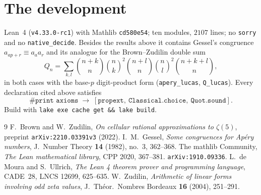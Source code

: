 \documentclass[11pt,a4paper]{amsart}
\theoremstyle{plain}
\theoremstyle{definition}
\theoremstyle{remark}
\begin{document}
\section{The development}

Lean~4 (\texttt{v4.33.0-rc1}) with Mathlib \texttt{cd580e54}; ten modules, $2107$ lines;
no \texttt{sorry} and no \texttt{native\_decide}. Besides the results above it contains
Gessel's congruence $a_{ap+r}\equiv a_aa_r$ \cite{Gessel1982} and its analogue for the
Brown--Zudilin double sum
\[
  Q_n=\sum_{k,l}\binom{n+k}n\binom nk^2\binom{n+l}n\binom nl^2\binom{n+k+l}n,
\]
in both cases with the base-$p$ digit-product form
(\texttt{apery\_lucas}, \texttt{Q\_lucas}). Every declaration cited above satisfies
\[
  \texttt{\#print axioms}\;\longrightarrow\;
  [\texttt{propext},\ \texttt{Classical.choice},\ \texttt{Quot.sound}].
\]
Build with \texttt{lake exe cache get \&\& lake build}.

\begin{thebibliography}{9}
F.~Brown and W.~Zudilin, \emph{On cellular rational approximations to $\zeta(5)$},
preprint \texttt{arXiv:2210.03391v3} (2022).
I.~M.~Gessel, \emph{Some congruences for Ap\'ery numbers},
J.\ Number Theory \textbf{14} (1982), no.~3, 362--368.
The mathlib Community, \emph{The Lean mathematical library}, CPP 2020, 367--381.
\texttt{arXiv:1910.09336}.
L.~de Moura and S.~Ullrich, \emph{The Lean 4 theorem prover and programming language},
CADE~28, LNCS 12699, 625--635.
W.~Zudilin, \emph{Arithmetic of linear forms involving odd zeta values},
J.\ Th\'eor.\ Nombres Bordeaux \textbf{16} (2004), 251--291.
\end{thebibliography}
\end{document}
